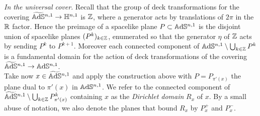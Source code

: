 \noindent\textit{In the universal cover}.
Recall that the group of deck transformations for the covering $\widetilde{\mathbb{A}\mathrm{d}\mathbb{S}}{}^{n,1} \to \mathbb{H}^{n,1}$ is $\mathbb{Z}$, where a generator acts by translations of $2\pi$ in the $\mathbb{R}$ factor. Hence the  preimage of a spacelike plane $P\subset\mathbb{A}\mathrm{d}\mathbb{S}^{n,1}$ is the disjoint union of spacelike planes $(P^k)_{k\in\mathbb{Z}}$, enumerated so that the generator $\eta$ of $\mathbb{Z}$ acts by sending $P^k$ to $P^{k+1}$.
Moreover each connected component of $\mathbb{A}\mathrm{d}\mathbb{S}^{n,1}\setminus\bigcup_{k\in\mathbb{Z}}P^k$ is a fundamental  domain for the action of deck transformations of the covering $\widetilde{\mathbb{A}\mathrm{d}\mathbb{S}}{}^{n,1}\to\mathbb{A}\mathrm{d}\mathbb{S}^{n,1}$.\\
Take now $x\in \widetilde{\mathbb{A}\mathrm{d}\mathbb{S}}{}^{n,1}$ and apply the construction above with $P = P_{\pi'(x)}$ the plane dual to $\pi'(x)$ in $\mathbb{A}\mathrm{d}\mathbb{S}^{n,1}$. We refer to the connected component of $\widetilde{\mathbb{A}\mathrm{d}\mathbb{S}}{}^{n,1} \setminus \bigcup_{k\in\mathbb{Z}}P_{\pi'(x)}^k$ containing $x$ as the \textit{Dirichlet domain} $R_x$ of $x$. By a small abuse of notation, we also denote the planes that bound $R_x$ by $P^+_x$ and $P^-_x$.
